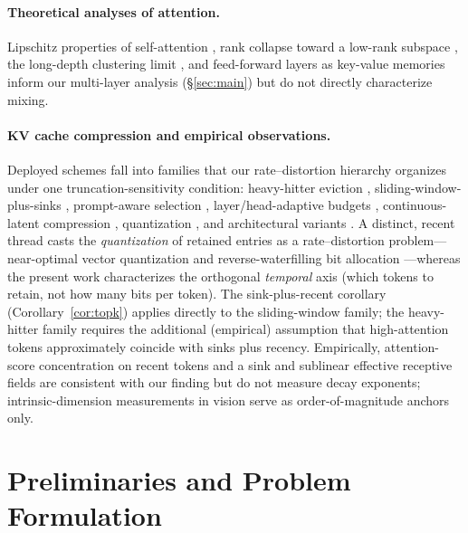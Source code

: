 \documentclass[11pt]{article}
\theoremstyle{plain}
\theoremstyle{definition}
\theoremstyle{remark}
\begin{document}
\paragraph{Theoretical analyses of attention.}
Lipschitz properties of self-attention \citep{kim2021lipschitz,
dasoulas2021lipschitz}, rank collapse toward a low-rank subspace
\citep{dong2021attention}, the long-depth clustering limit
\citep{geshkovski2023mathematical}, and feed-forward layers as
key-value memories \citep{geva2020transformer,phuong2022formal}
inform our multi-layer analysis (\S\ref{sec:main}) but do not
directly characterize mixing.

\paragraph{KV cache compression and empirical observations.}
Deployed schemes fall into families that our rate--distortion
hierarchy organizes under one truncation-sensitivity condition:
heavy-hitter eviction \citep{zhang2023h2o,liu2023scissorhands,
ge2024fastgen}, sliding-window-plus-sinks
\citep{xiao2024efficient,jiang2023mistral7b}, prompt-aware selection
\citep{li2024snapkv,tang2024quest}, layer/head-adaptive budgets
\citep{cai2024pyramidkv,feng2024adakv}, continuous-latent compression
\citep{deepseek2024mla}, quantization \citep{liu2024kivi,kang2024gear},
and architectural variants \citep{ainslie2023gqa,shazeer2019fast,
llama3-2024}. A distinct, recent thread casts the
\emph{quantization} of retained entries as a rate--distortion
problem---near-optimal vector quantization
\citep{zandieh2025turboquant} and reverse-waterfilling bit allocation
\citep{zuo2026ratequant}---whereas the present work characterizes the
orthogonal \emph{temporal} axis (which tokens to retain, not how many
bits per token). The sink-plus-recent corollary
(Corollary~\ref{cor:topk}) applies directly to the sliding-window
family; the heavy-hitter family requires the additional (empirical)
assumption that high-attention tokens approximately coincide with
sinks plus recency. Empirically, attention-score concentration on
recent tokens and a sink \citep{xiao2024efficient} and sublinear
effective receptive fields \citep{chen2023longlora} are consistent
with our finding but do not measure decay exponents; intrinsic-dimension
measurements in vision \citep{pope2021intrinsic,ansuini2019intrinsic}
serve as order-of-magnitude anchors only.

\section{Preliminaries and Problem Formulation}
\label{sec:setup}
\end{document}
